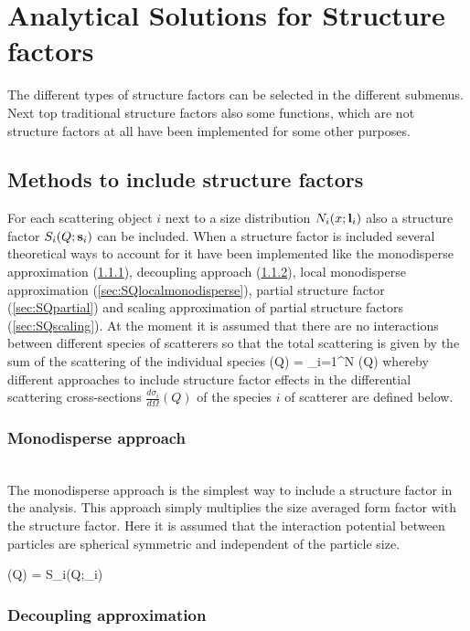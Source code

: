 \chapter{Analytical Solutions for Structure factors}
\label{sec:structurefactor}
The different types of structure factors can be selected in the
different submenus. Next top traditional structure factors also
some functions, which are not structure factors
at all have been implemented for some other purposes.

\section{Methods to include structure factors}
For each scattering object $i$ next to a size distribution $N_i(x;\B{l}_i)$ also a
structure factor $S_i(Q;\B{s}_i)$ can be included. When a structure factor is included
several theoretical ways to account for it have been implemented
like the monodisperse approximation (\ref{sec:SQmonodisperse}),
decoupling approach (\ref{sec:SQdecoupling}),
local monodisperse approximation (\ref{sec:SQlocalmonodisperse}),
partial structure factor (\ref{sec:SQpartial})
and scaling approximation of partial structure factors (\ref{sec:SQscaling}).
At the moment it is assumed that there are no interactions between different species
of scatterers so that the total scattering is given by the sum of the scattering of the
individual species
\BE
{}(Q) = \sum\limits_{i=1}^N (Q)
\EE
whereby different approaches to include structure factor effects in
the differential scattering cross-sections $\frac{d\sigma_i}{d\Omega}(Q)$
of the species $i$ of scatterer are defined below.

\subsection{Monodisperse approach}
\label{sec:SQmonodisperse}
~\\

The monodisperse approach is the simplest way to include a structure factor in the analysis.
This approach simply multiplies the size averaged form factor with the structure factor.
Here it is assumed that the interaction potential between particles are spherical symmetric
and independent of the particle size.

\BE {}(Q) =  S_i(Q;_i)
\EE

\subsection{Decoupling approximation}
\label{sec:SQdecoupling}
~\\

